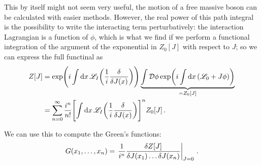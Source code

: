 \documentclass[main.tex]{subfiles}
\begin{document}
This by itself might not seem very useful, the motion of a free massive boson can be calculated with easier methods.
However, the real power of this path integral is the possibility to write the interacting term perturbatively: the interaction Lagrangian is a function of \(\phi \), which is what we find if we perform a functional integration of the argument of the exponential in \(Z_0 [J]\) with respect to \(J\); so we can express the full functinal as 
%
\begin{align}
Z[J] &= \exp( i\int \dd{x} \mathscr{L}_I\qty( \frac{1}{i} \fdv{}{J(x)}))
\underbrace{\int \mathcal{D} \phi \exp(i \int \dd{x} \qty( \mathscr{L}_0 + J \phi )) }_{= Z_0 [J]}  \\
&= \sum _{n=0}^{\infty } \frac{i^{n}}{n!} \qty[ \int \dd{x} \mathscr{L}_I\qty(\frac{1}{i} \fdv{}{J(x)})]^{n} Z_0 [J]
\,.
\end{align}

We can use this to compute the Green's functions: 
%
\begin{align}
G(x_1 , \dots , x_n) = \eval{\frac{1}{i^{n}} \frac{ \delta Z[J]}{ \delta J (x_1 ) \dots \delta J(x_n)}}_{J = 0}
\,.
\end{align}

\end{document}
